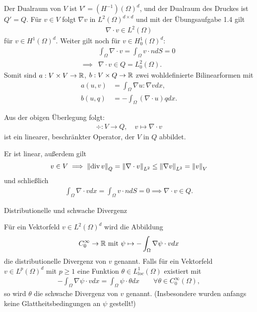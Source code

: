 Der Dualraum von $V$ ist $V' = (H^{-1})(\Omega)^{d}$, und der Dualraum des Druckes ist $Q' = Q$. Für $v \in V$ folgt $\nabla v$ in $L^2(\Omega)^{d \times d}$ und mit der Übungsaufgabe 1.4 gilt
\begin{align*}
  \nabla \cdot v \in L^{2}(\Omega) 
\end{align*}
für $v \in H^{1}(\Omega)^{d}$. Weiter gilt noch für $v \in H_{0}^{1}(\Omega)^{d}$:
\begin{align*}
  &\int_{\Omega}\nabla\cdot v = \int_{\Omega}v \cdot n dS = 0\\
\implies & \nabla\cdot v \in Q = L_{0}^{2}(\Omega). 
\end{align*}
Somit sind $a: V \times V \to \mathbb{R}$, $b: V \times Q \to \mathbb{R}$ zwei wohldefinierte Bilinearformen mit
\begin{align*}
  a(u, v) &= \int_{\Omega}\nabla u: \nabla v dx, \\
  b(u, q) &= -\int_{\Omega}(\nabla\cdot u)q dx.
\end{align*}
\begin{bemerkung*}
  Aus der obigen Überlegung folgt:
  \begin{align*}
    \div: V \to Q, \quad v \mapsto \nabla\cdot v
  \end{align*}
ist ein linearer, beschränkter Operator, der $V$ in $Q$ abbildet. 

Er ist linear, außerdem gilt
\begin{align*}
  v \in V \implies \left \|\operatorname{div} v \right\| _{Q} = \left \|\nabla\cdot v \right\|_{L^{2}} \leq \left \|\nabla v \right\|_{L^{2}} = \left \|v \right\|_{V}
\end{align*}
und schließlich
\begin{align*}
  \int_{\Omega} \nabla\cdot v dx = \int_{\Omega} v \cdot n dS = 0 \implies \nabla\cdot v \in Q.
\end{align*}
\end{bemerkung*}
\begin{definition*}
  Distributionelle und schwache Divergenz

Für ein Vektorfeld $v \in L^{2}(\Omega)^{d}$ wird die Abbildung
\begin{align*}
  C_{0}^{\infty} \to \mathbb{R} \text{ mit } \psi \mapsto - \int_{\Omega} \nabla \psi \cdot v dx
\end{align*}
die distributionelle Divergenz von $v$ genannt. Falls für ein Vektorfeld $v \in L^{p}(\Omega)^{d}$ mit $p\geq 1$ eine Funktion $\theta \in L_{loc}^{1}(\Omega)$ existiert mit
\begin{align*}
  - \int_{\Omega}\nabla \psi \cdot v dx = \int_{\Omega} \psi \cdot \theta dx \qquad \forall \theta \in C_{0}^{\infty}(\Omega), 
\end{align*}
so wird $\theta$ die schwache Divergenz von $v$ genannt. (Insbesondere wurden anfangs keine Glattheitsbedingungen an $\psi$ gestellt!)
\end{definition*}
